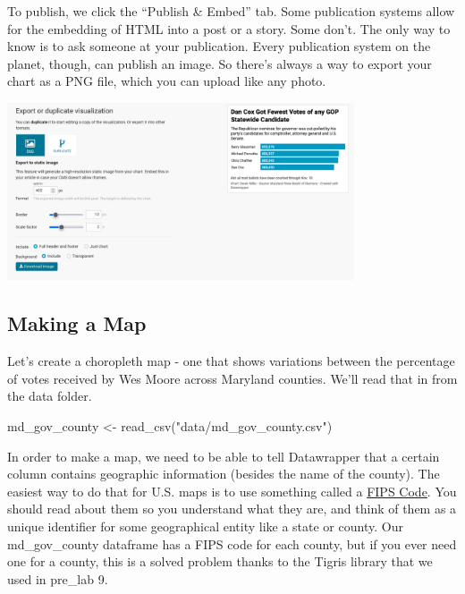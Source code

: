 \documentclass[
  letterpaper,
  DIV=11,
  numbers=noendperiod]{scrreprt}
\newenvironment{Shaded}{\begin{snugshade}}{\end{snugshade}}
\newcommand{\FunctionTok}[1]{\textcolor[rgb]{0.28,0.35,0.67}{#1}}
\newcommand{\NormalTok}[1]{\textcolor[rgb]{0.00,0.23,0.31}{#1}}
\newcommand{\OtherTok}[1]{\textcolor[rgb]{0.00,0.23,0.31}{#1}}
\newcommand{\StringTok}[1]{\textcolor[rgb]{0.13,0.47,0.30}{#1}}
\begin{document}
To publish, we click the ``Publish \& Embed'' tab. Some publication
systems allow for the embedding of HTML into a post or a story. Some
don't. The only way to know is to ask someone at your publication. Every
publication system on the planet, though, can publish an image. So
there's always a way to export your chart as a PNG file, which you can
upload like any photo.

\includegraphics[width=4.04in,height=\textheight]{./images/datawrapper6.png}

\hypertarget{making-a-map}{%
\subsection{Making a Map}\label{making-a-map}}

Let's create a choropleth map - one that shows variations between the
percentage of votes received by Wes Moore across Maryland counties.
We'll read that in from the data folder.

\begin{Shaded}
\begin{Highlighting}[]
\NormalTok{md\_gov\_county }\OtherTok{\textless{}{-}} \FunctionTok{read\_csv}\NormalTok{(}\StringTok{"data/md\_gov\_county.csv"}\NormalTok{)}
\end{Highlighting}
\end{Shaded}

In order to make a map, we need to be able to tell Datawrapper that a
certain column contains geographic information (besides the name of the
county). The easiest way to do that for U.S. maps is to use something
called a
\href{https://www.census.gov/programs-surveys/geography/guidance/geo-identifiers.html}{FIPS
Code}. You should read about them so you understand what they are, and
think of them as a unique identifier for some geographical entity like a
state or county. Our md\_gov\_county dataframe has a FIPS code for each
county, but if you ever need one for a county, this is a solved problem
thanks to the Tigris library that we used in pre\_lab 9.
\end{document}
